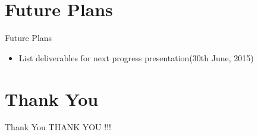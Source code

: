 \documentclass[10pt, a4paper]{beamer}
\begin{document}
\section{Future Plans}
\begin{frame}{Future Plans}
	\begin{itemize}
		\item List deliverables for next progress presentation(30th June, 2015)  
	\end{itemize}
\end{frame}


\section{Thank You}
\begin{frame}{Thank You}
	\centering THANK YOU !!!
\end{frame}
\end{document}
